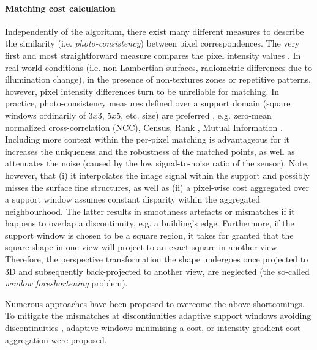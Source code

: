\documentclass[journal]{IEEEtran}
\begin{document}
\paragraph{Matching cost calculation}
Independently of the algorithm, there exist many different measures to describe the similarity (i.e. \textit{photo-consistency}) between pixel correspondences. The very first and most straightforward measure compares the pixel intensity values \cite{kanade1995development,birchfield1998pixel}. In real-world conditions (i.e. non-Lambertian surfaces, radiometric differences due to illumination change), in the presence of non-textures zones or repetitive patterns, however, pixel intensity differences turn to be unreliable for matching. In practice, photo-consistency measures defined over a support domain (square windows ordinarily of   $3 x 3$, $5 x 5$, etc. size) are preferred \cite{furukawa2015multi}, e.g. zero-mean normalized cross-correlation (NCC), Census, Rank \cite{zabih1994non}, Mutual Information \cite{viola1997alignment}. Including more context within the per-pixel matching is advantageous for it increases the uniqueness and the robustness of the matched points, as well as attenuates the noise (caused by the low signal-to-noise ratio of the sensor). Note, however, that (i) it interpolates the image signal within the support and possibly misses the surface fine structures, as well as (ii) a pixel-wise cost aggregated over a support window assumes constant disparity within the aggregated neighbourhood. The latter results in smoothness artefacts or mismatches if it happens to overlap a discontinuity, e.g. a building's edge. Furthermore, if the support window is chosen to be a square region, it takes for granted that the square shape in one view will project to an exact square in another view. Therefore, the perspective transformation the shape undergoes once projected to 3D and subsequently back-projected to another view, are neglected (the so-called \textit{window foreshortening} problem).\par 
%
Numerous approaches have been proposed to overcome the above shortcomings. To mitigate the mismatches at discontinuities adaptive support windows avoiding discontinuities \cite{yoon2006adaptive}, adaptive windows minimising a cost, or intensity gradient cost aggregation \cite{hirschmuller:08:sgm} were proposed.
\end{document}
